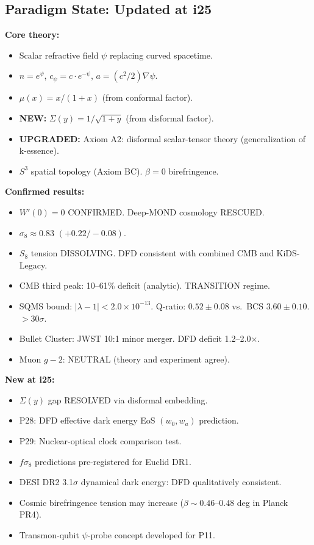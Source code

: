 \documentclass[11pt]{article}
\newcommand{\ee}[1]{\times 10^{#1}}
\begin{document}
\subsection{Paradigm State: Updated at i25}

\begin{tcolorbox}[colback=yellow!5!white, colframe=yellow!50!black,
  title=\textbf{DFD PARADIGM STATE --- i25}]

\textbf{Core theory:}
\begin{itemize}
  \item Scalar refractive field $\psi$ replacing curved spacetime.
  \item $n = e^\psi$, $c_\psi = c \cdot e^{-\psi}$,
    $a = (c^2/2)\nabla\psi$.
  \item $\mu(x) = x/(1+x)$ (from conformal factor).
  \item \textbf{NEW:} $\Sigma(y) = 1/\sqrt{1+y}$ (from disformal factor).
  \item \textbf{UPGRADED:} Axiom A2: disformal scalar-tensor theory
    (generalization of k-essence).
  \item $S^3$ spatial topology (Axiom BC). $\beta = 0$ birefringence.
\end{itemize}

\textbf{Confirmed results:}
\begin{itemize}
  \item $W'(0) = 0$ CONFIRMED. Deep-MOND cosmology RESCUED.
  \item $\sigma_8 \approx 0.83$ $(+0.22/-0.08)$.
  \item $S_8$ tension DISSOLVING. DFD consistent with combined CMB
    and KiDS-Legacy.
  \item CMB third peak: 10--61\% deficit (analytic). TRANSITION regime.
  \item SQMS bound: $|\lambda-1| < 2.0\ee{-13}$.
    Q-ratio: $0.52 \pm 0.08$ vs.\ BCS $3.60 \pm 0.10$. $> 30\sigma$.
  \item Bullet Cluster: JWST 10:1 minor merger. DFD deficit 1.2--2.0$\times$.
  \item Muon $g-2$: NEUTRAL (theory and experiment agree).
\end{itemize}

\textbf{New at i25:}
\begin{itemize}
  \item $\Sigma(y)$ gap RESOLVED via disformal embedding.
  \item P28: DFD effective dark energy EoS $(w_0, w_a)$ prediction.
  \item P29: Nuclear-optical clock comparison test.
  \item $f\sigma_8$ predictions pre-registered for Euclid DR1.
  \item DESI DR2 3.1$\sigma$ dynamical dark energy:
    DFD qualitatively consistent.
  \item Cosmic birefringence tension may increase
    ($\beta \sim 0.46$--$0.48$ deg in Planck PR4).
  \item Transmon-qubit $\psi$-probe concept developed for P11.
\end{itemize}


\end{tcolorbox}
\end{document}

